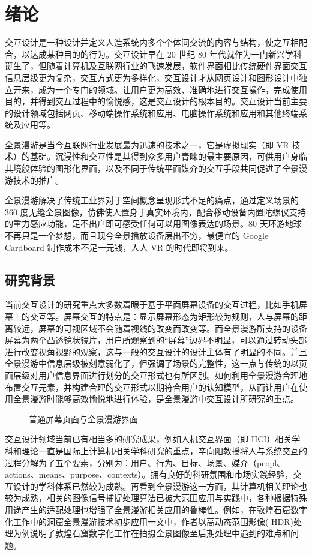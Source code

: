 \chapter{绪论}

交互设计是一种设计并定义人造系统内多个个体间交流的内容与结构，使之互相配合，以达成某种目的的行为。交互设计早在 20 世纪 80 年代就作为一门新兴学科诞生了，但随着计算机及互联网行业的飞速发展，软件界面相比传统硬件界面交互信息层级更为复杂，交互方式更为多样化，交互设计才从网页设计和图形设计中独立开来，成为一个专门的领域。让用户更为高效、准确地进行交互操作，完成使用目的，并得到交互过程中的愉悦感，这是交互设计的根本目的。交互设计当前主要的设计领域包括网页、移动端操作系统和应用、电脑操作系统和应用和其他终端系统及应用等。

全景漫游是当今互联网行业发展最为迅速的技术之一，它是虚拟现实（即 VR 技术）的基础。沉浸性和交互性是其得到众多用户青睐的最主要原因，可供用户身临其境般体验的图形化界面，以及不同于传统平面媒介的交互手段共同促进了全景漫游技术的推广。

全景漫游解决了传统工业界对于空间概念呈现形式不足的痛点，通过定义场景的 360 度无缝全景图像，仿佛使人置身于真实环境内，配合移动设备内置陀螺仪支持的重力感应功能，足不出户即可感受任何可以用图像表达的场景。80 天环游地球不再只是一个梦想，而且现今全景播放设备层出不穷，最便宜的 Google Cardboard 制作成本不足一元钱，人人 VR 的时代即将到来。

\section{研究背景}
当前交互设计的研究重点大多数着眼于基于平面屏幕设备的交互过程，比如手机屏幕上的交互等。屏幕交互的特点是：显示屏幕形态为矩形较为规则，人与屏幕的距离较远，屏幕的可视区域不会随着视线的改变而改变等。而全景漫游所支持的设备屏幕为两个凸透镜状镜片，用户所观察到的“屏幕”边界不明显，可以通过转动头部进行改变视角视野的观察，这与一般的交互设计的设计主体有了明显的不同。并且全景漫游中信息层级被刻意弱化了，但强调了场景的完整性，这一点与传统的以页面层级对用户信息界面进行划分的交互形式也有所区别。如何利用全景漫游合理地布置交互元素，并构建合理的交互形式以期符合用户的认知模型，从而让用户在使用全景漫游时能够高效愉悦地进行体验，是全景漫游中交互设计所研究的重点。

\begin{figure}[htp]
\centering
{}
\caption{普通屏幕页面与全景漫游界面}
\label{fig:screen}
\end{figure}

交互设计领域当前已有相当多的研究成果，例如人机交互界面（即 HCI）相关学科和理论一直是国际上计算机相关学科研究的重点，辛向阳教授将人与系统交互的过程分解为了五个要素，分别为：用户、行为、目标、场景、媒介（peopl、actions、means、purpose、contexts）。拥有良好的科研氛围和市场实践经验，交互设计的学科体系已然较为成熟。再看到全景漫游这一方面，其计算机相关理论也较为成熟，相关的图像信号捕捉处理算法已被大范围应用与实践中，各种根据特殊用途产生的适配处理也增强了全景漫游相关应用的鲁棒性。例如，在敦煌石窟数字化工作中的洞窟全景漫游技术初步应用一文中，作者以高动态范围影像( HDR)处理为例说明了敦煌石窟数字化工作在拍摄全景图像至后期处理中遇到的难点和问题。

